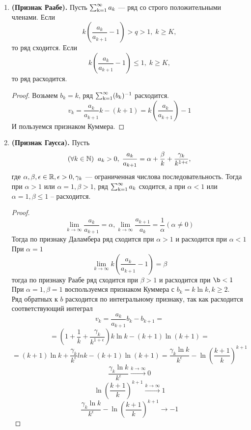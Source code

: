 \begin{enumerate}
\begin{proof}
$$\sum_{k=K}^{n-1} \big( a_k b_k-a_{k+1}b_{k+1} \big) = a_Kb_K - a_nb_n \ge l \sum_{k=K}^{n-1} a_{k+1} = l \sum_{j=K+1}^{n}a_{j}$$
Так как $a_Kb_K \ge l\sum\limits_{j=K+1}^{n}a_j$, то частичные суммы ряда $\sum_{j=K+1}^{\infty}a_j$ ограничены и, значит, ряд $\ssum a_k$ сходится.
Итак, $$v_k = \frac{a_k}{a_{k+1}}b_k - b_{k+1} \le 0 \text{ при } k \ge K,$$
т.е. $a_k b_k - a_{k+1}b_{k+1}\le 0$ при $k \ge K$.
Значит, $$ \sum_{k=K}^{n-1} \big( a_k b_k-a_{k+1}b_{k+1} \big) = a_K b_K - a_n b_n \le 0,\; n>K$$
отсюда: $a_N \ge a_Kb_K - (b_n)^{-1}$. Из расходимости ряда $\ssum b_k$ следует расходимость ряда $\ssum a_k$
\end{proof}
\item
\textbf{(Признак Раабе).} Пусть $\ssum a_k$ --- ряд со строго положительными членами.
Если $$k \left( \frac{a_k}{a_{k+1}} -1 \right) > q > 1,\; k \ge K,$$
то ряд сходится.
Если $$k \left( \frac{a_k}{a_{k+1}} -1 \right) \le 1,\; k \ge K,$$
то ряд расходится.
\begin{proof}
Возьмем $b_k =k$, ряд $\operatorname{\sum_{k=1}^{\infty}} (b_k)^{-1}$ расходится.
$$v_k = \frac{a_k}{a_{k+1}}k - (k+1) = k (\frac{a_k}{a_{k+1}}) -1 $$
И пользуемся признаком Куммера.
\end{proof}
\item
\textbf{(Признак Гаусса).} Пусть 
$$(\forall k \in \operatorname{\mathbb{N}}) \;\; a_k>0,\; \frac{a_k}{a_{k+1}} = \alpha + \frac{\beta}{k}+\frac{\gamma_k}{k^{1+\epsilon}}, $$
где $\alpha, \beta, \epsilon \in \operatorname{\mathbb{R}}, \epsilon > 0, \gamma_k$ --- ограниченная числова последовательность.
Тогда при $\alpha > 1$ или $\alpha = 1, \beta > 1$, ряд $\ssum a_k$ сходится, а  при $\alpha < 1$ или $\alpha = 1, \beta \le 1$ -- расходится.
\begin{proof}
$$\lim_{k \to \infty} \frac{a_k}{a_{k+1}} = \alpha, \lim_{k \to \infty} \frac{a_{k+1}}{a_k} = \frac{1}{\alpha} (\alpha \not=0)$$
Тогда по признаку Даламбера ряд сходится при $\alpha > 1$ и расходится при $\alpha < 1$\\
При $\alpha = 1$\\
$$\lim_{k \to \infty} k ( \frac{a_k}{a_{k+1}} -1 ) = \beta $$
тогда по признаку Раабе ряд сходится при $\beta > 1$ и расходится при $\b < 1$\\
При $\alpha =1, \beta =1$ воспользуемся признаком Куммера с $b_k = k \ln k, k\ge 2.$\\
Ряд обратных к $b$ расходится по интегральному признаку, так как расходится соответствующий интеграл
$$v_k = \frac{a_k}{a_{k+1}}b_k - b_{k+1} =$$
$$= \left(1 + \frac{1}{k} + \frac{\gamma_k}{k^{1+\epsilon}} \right) k \ln k - (k+1)\ln(k+1) =$$
$$=(k+1)\ln k + \frac{\gamma_k}{k^{\epsilon}}ln k - (k+1)\ln(k+1) = \frac{\gamma_k \ln k}{k^{\epsilon}} - \ln(\frac{k+1}{k})^{k+1}$$
$$\frac{\gamma_k \ln k}{k^{\epsilon}} \xrightarrow{k \to \infty} 0$$
$$\ln(\frac{k+1}{k})^{k+1} \xrightarrow{k \to \infty} 1$$
$$\frac{\gamma_k \ln k}{k^{\epsilon}} - \ln(\frac{k+1}{k})^{k+1} \to -1 $$
\end{proof}
\end{enumerate}
